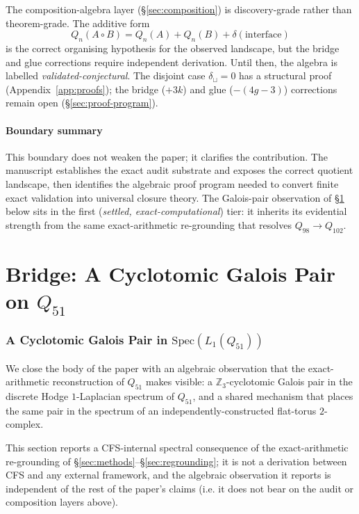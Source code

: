 \documentclass[12pt,a4paper]{article}
\theoremstyle{definition}
\theoremstyle{remark}
\newcommand{\bZ}{\mathbb{Z}}
\newcommand{\Qn}{Q_n}
\begin{document}
The composition-algebra layer (\S\ref{sec:composition}) is
discovery-grade rather than theorem-grade. The additive form
\[
  \Qn(A\circ B)=\Qn(A)+\Qn(B)+\delta(\mathrm{interface})
\]
is the correct organising hypothesis for the observed landscape, but
the bridge and glue corrections require independent derivation. Until
then, the algebra is labelled \emph{validated-conjectural}. The
disjoint case $\delta_{\sqcup} = 0$ has a structural proof
(Appendix~\ref{app:proofs}); the bridge ($+3k$) and glue ($-(4g{-}3)$)
corrections remain open (\S\ref{sec:proof-program}).

\subsection{Boundary summary}\label{sec:vb-summary}

This boundary does not weaken the paper; it clarifies the
contribution. The manuscript establishes the exact audit substrate and
exposes the correct quotient landscape, then identifies the algebraic
proof program needed to convert finite exact validation into universal
closure theory. The Galois-pair observation of
\S\ref{sec:galois-pair} below sits in the first
(\emph{settled, exact-computational}) tier: it inherits its evidential
strength from the same exact-arithmetic re-grounding that resolves
$Q_{98} \to Q_{102}$.

\part*{Bridge: A Cyclotomic Galois Pair on $Q_{51}$}

\section{A Cyclotomic Galois Pair in
$\mathrm{Spec}(L_1(Q_{51}))$}\label{sec:galois-pair}

We close the body of the paper with an algebraic observation that the
exact-arithmetic reconstruction of $Q_{51}$ makes visible: a
$\bZ_3$-cyclotomic Galois pair in the discrete Hodge $1$-Laplacian
spectrum of $Q_{51}$, and a shared mechanism that places the same
pair in the spectrum of an independently-constructed flat-torus
$2$-complex.

This section reports a CFS-internal spectral consequence of the
exact-arithmetic re-grounding of \S\ref{sec:methods}--\S\ref{sec:regrounding};
it is not a derivation between CFS and any external framework, and
the algebraic observation it reports is independent of the rest of
the paper's claims (i.e. it does not bear on the audit or composition
layers above).
\end{document}
